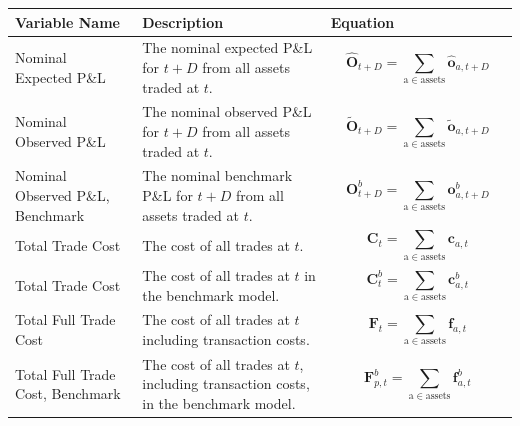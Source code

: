 \documentclass[a4paper,11pt,oneside]{article}
\theoremstyle{plain}
\theoremstyle{definition}
\begin{document}
		\begin{longtable}{|p{0.25\linewidth}|p{0.375\linewidth}|p{0.375\linewidth}|}
		\hline
		\rowcolor{beaublue}
		\textbf{Variable Name} &\textbf{Description}&\textbf{Equation}  \\\hline	

		{Nominal Expected P\&L} 
		& {The nominal expected P\&L for $t+D$ from all assets traded at $t$.}
		& {	\begin{equation}
			\mathbf{\hat{O}}_{t+D} = \sum_{\mathrm{a \in assets}} \mathbf{\hat{o}}_{a, {t+D}} 
			\end{equation}
		} \\\hline

		{Nominal Observed P\&L} 
		& {The nominal observed P\&L for $t+D$ from all assets traded at $t$.}
		& {\begin{equation}
			\mathbf{\tilde{O}}_{t+D} = \sum_{\mathrm{a \in assets}} \mathbf{\tilde{o}}_{a, {t+D}}
			\end{equation}
		} \\\hline
	
		{Nominal Observed P\&L, Benchmark} 
		& {The nominal benchmark P\&L for $t+D$ from all assets traded at $t$.}
		& {	\begin{equation}
			\mathbf{O}^b_{t+D} = \sum_{\mathrm{a \in assets}} \mathbf{o}^b_{a, {t+D}} 
			\end{equation}
		} \\\hline
	
		{Total Trade Cost} 
		& {The cost of all trades at $t$.}
		& {\begin{equation}
			\mathbf{C}_t = \sum_{\mathrm{a \in assets}} \mathbf{c}_{a,t} 
			\end{equation}
		} \\\hline
	
		{Total Trade Cost} 
		& {The cost of all trades at $t$ in the benchmark model.}
		& {\begin{equation}
			\mathbf{C}^b_{t} = \sum_{\mathrm{a \in assets}} \mathbf{c}^b_{a ,t} 
			\end{equation}
		} \\\hline
	
		{Total Full Trade Cost} 
		& {The cost of all trades at $t$ including transaction costs.}
		& {\begin{equation}
			\mathbf{F}_t = \sum_{\mathrm{a \in assets}} \mathbf{f}_{a,t} 
			\end{equation}
		} \\\hline
	
		{Total Full Trade Cost, Benchmark} 
		& {The cost of all trades at $t$, including transaction costs, in the benchmark model.}
		& {\begin{equation}
			\mathbf{F}^b_{p,t} = \sum_{\mathrm{a \in assets}} \mathbf{f}^b_{a,t} 
			\end{equation}
		} \\\hline
		

\end{longtable}
\end{document}
